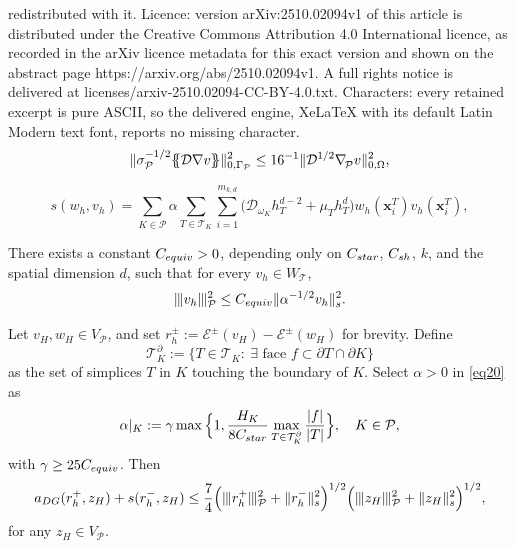 \documentclass[10pt,a4paper]{amsart}
\newcommand\bx{\boldsymbol{x}}
\newcommand\calP{{\mathcal{P}}}
\newcommand\calT{{\mathcal{T}}}
\newcommand{\bnabla}{\nabla_{\kern-.05cm\mesh}^{}}
\newcommand{\mean}[1]{\{\kern-1.1mm\{#1\}\kern-1.1mm\}}
\newcommand{\mesh}{\calP}
\newcommand{\ndgp}[1]{| \kern -.25mm \|{#1}| \kern -.25mm \|_{\rm \mesh}}
\newcommand{\norm}[2]{\|{#1}\|_{{#2}}}
\renewcommand{\k}{K}
\begin{document}
redistributed with it. Licence: version arXiv:2510.02094v1 of this article is distributed under the Creative Commons Attribution 4.0 International licence, as recorded in the arXiv licence metadata for this exact version and shown on the abstract page https://arxiv.org/abs/2510.02094v1. A full rights notice is delivered at licenses/arxiv-2510.02094-CC-BY-4.0.txt. Characters: every retained excerpt is pure ASCII, so the delivered engine, XeLaTeX with its default Latin Modern text font, reports no missing character.
  \begin{equation}\label{indef_est_important}
  \norm{ \sigma_\mesh^{-1/2}\mean{\mathcal{D}\nabla v}}{0,\Gamma_{\calP}}^2
  \le 
  16^{-1}\norm{\mathcal{D}^{1/2} \bnabla v}{0,\Omega}^2,
  \end{equation}

\begin{equation}
  s(w_h,v_h)=\sum_{K\in\mesh}\alpha\sum_{T\in\calT_K}\sum_{i=1}^{m_{k,d}}
  \big(\mathcal{D}_{\omega_K} h_T^{d-2}+\mu_T h_T^{d} \big)
  w_h(\bx_i^T)v_h(\bx_i^T) ,\label{eq20}
\end{equation}

\begin{lemma}
  \label{Lem:s}
There exists a constant $C_{\rm equiv}>0$, depending only on
$C_{\rm star}$, $C_{\rm sh}$, $k$, and the spatial dimension $d$, such
that for every $v_h\in W_\calT$,
\begin{align}
  \ndgp{ v_{h}}^{2}
   \le  C_{\rm equiv} \|\alpha^{-1/2} v_h \|_{s}^{2}.  \label{eq22}
\end{align}
\end{lemma}

\begin{lemma}\label{Lem:cont_twoscale}
Let $v_H,w_H\in V_\calP$, and set
$r_h^\pm:=\mathcal{E}^\pm(v_H)-\mathcal{E}^\pm(w_H)$ for brevity.
Define
\[
\calT_\k^\partial:=\{T\in \calT_\k:\ \exists \text{ face } f\subset \partial T\cap\partial K\}
\]
as the set of simplices $T$ in $\k$ touching the boundary of $\k$.  
Select $\alpha>0$ in \eqref{eq20} as
\begin{equation}\label{alpha_choice}
  \alpha|_\k:= \gamma \max\Big\{1,\frac{ H_{\k}}{8C_{\rm star}}\max_{T\in\calT_\k^\partial}\frac{|f|}{|T|}\Big\},\quad K\in\mesh,
\end{equation}
with $\gamma\ge 25C_{\rm equiv}$. Then
\begin{align}\label{cont_nonlinear}
a_{DG}(r_h^+, z_H) +s(r_h^-,z_H) 
\le \frac{7}{4}\Big(\ndgp{r_h^+}^2+\norm{r_h^-}{s}^2\Big)^{1/2} 
\Big(\ndgp{z_H}^2+\norm{z_H}{s}^2\Big)^{1/2}, 
\end{align}
for any $z_H\in V_\mesh$.
\end{lemma}
\end{document}

